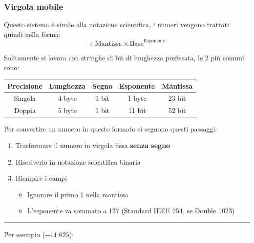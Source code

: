 \documentclass{article}
\begin{document}
\subsubsection{Virgola mobile}

Questo sistema è simile alla notazione scientifica, i numeri vengono trattati quindi nella forma: $$\pm \ \text{Mantissa}\times\text{Base}^{\text{Esponente}}$$

\noindent Solitamente si lavora con stringhe di bit di lunghezza prefissata, le 2 più comuni sono:

\begin{table}[ht]
    \centering
    \begin{tabular}{c|c|c|c|c}
         Precisione & Lunghezza & Segno & Esponente & Mantissa\\
         \hline
         \rule{0pt}{3ex}Singola & 4 byte & 1 bit & 1 byte & 23 bit\\
         \hline
         \rule{0pt}{3ex}Doppia & 5 byte & 1 bit & 11 bit & 52 bit
    \end{tabular}
    \label{tab:floatpoint_num}
\end{table}

\newpage

\noindent Per convertire un numero in questo formato si seguono questi passaggi:
\begin{enumerate}
    \item Trasformare il numero in virgola fissa \textbf{senza segno}
    \item Riscriverlo in notazione scientifica binaria
    \item Riempire i campi
        \begin{itemize}
            \item Ignorare il primo 1 nella mantissa
            \item L'esponente va sommato a 127 (Standard IEEE 754, se Double 1023)
        \end{itemize}
\end{enumerate}

\vspace{5pt}

\noindent\rule{\textwidth}{0.5pt}

\noindent Per esempio ($-11.625$):
\end{document}
